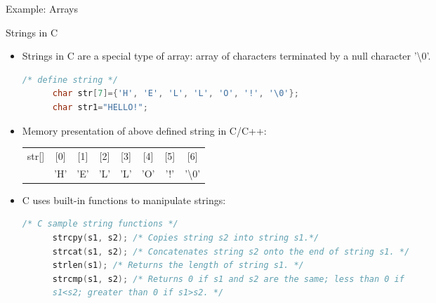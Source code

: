 \documentclass[10pt,t]{beamer}
\begin{document}
\begin{frame}[fragile]{Example: Arrays}
  
\end{frame}

\begin{frame}{Strings in C}
  \begin{itemize}
  \item Strings in C are a special type of array: array of characters terminated by a null character '\textbackslash{}0'.

    \begin{lstlisting}[language=C,basicstyle=\scriptsize\ttfamily]
      /* define string */
      char str[7]={'H', 'E', 'L', 'L', 'O', '!', '\0'};
      char str1="HELLO!";
    \end{lstlisting}

  \item Memory presentation of above defined string in C/C++:

    \begin{tabular}{|c|c|c|c|c|c|c|c|}
      \hline
      str[] & [0] & [1] & [2] & [3] & [4] & [5] & [6] \\
      \cline{2-8}
      & 'H' & 'E' & 'L' & 'L' & 'O' & '!' & '\textbackslash{}0' \\
     \hline
    \end{tabular}

  \item C uses built-in functions to manipulate strings:
    \begin{lstlisting}[language=C,basicstyle=\scriptsize\ttfamily]
      /* C sample string functions */
      strcpy(s1, s2); /* Copies string s2 into string s1.*/
      strcat(s1, s2); /* Concatenates string s2 onto the end of string s1. */
      strlen(s1); /* Returns the length of string s1. */
      strcmp(s1, s2); /* Returns 0 if s1 and s2 are the same; less than 0 if
      s1<s2; greater than 0 if s1>s2. */
    \end{lstlisting}
  \end{itemize}

  
\end{frame}
\end{document}
